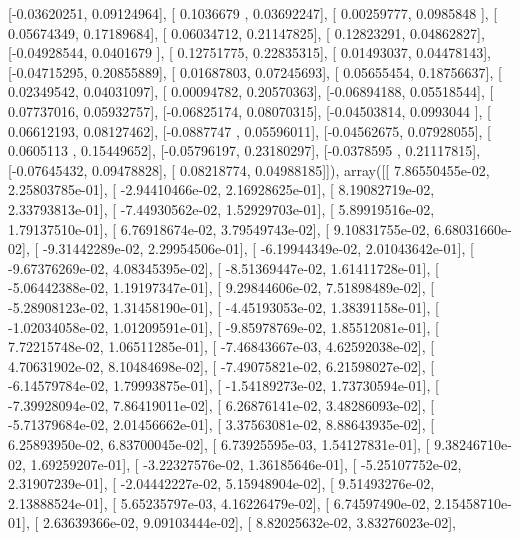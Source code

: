 \documentclass{article}
\begin{document}
       [-0.03620251,  0.09124964],
       [ 0.1036679 ,  0.03692247],
       [ 0.00259777,  0.0985848 ],
       [ 0.05674349,  0.17189684],
       [ 0.06034712,  0.21147825],
       [ 0.12823291,  0.04862827],
       [-0.04928544,  0.0401679 ],
       [ 0.12751775,  0.22835315],
       [ 0.01493037,  0.04478143],
       [-0.04715295,  0.20855889],
       [ 0.01687803,  0.07245693],
       [ 0.05655454,  0.18756637],
       [ 0.02349542,  0.04031097],
       [ 0.00094782,  0.20570363],
       [-0.06894188,  0.05518544],
       [ 0.07737016,  0.05932757],
       [-0.06825174,  0.08070315],
       [-0.04503814,  0.0993044 ],
       [ 0.06612193,  0.08127462],
       [-0.0887747 ,  0.05596011],
       [-0.04562675,  0.07928055],
       [ 0.0605113 ,  0.15449652],
       [-0.05796197,  0.23180297],
       [-0.0378595 ,  0.21117815],
       [-0.07645432,  0.09478828],
       [ 0.08218774,  0.04988185]]), array([[  7.86550455e-02,   2.25803785e-01],
       [ -2.94410466e-02,   2.16928625e-01],
       [  8.19082719e-02,   2.33793813e-01],
       [ -7.44930562e-02,   1.52929703e-01],
       [  5.89919516e-02,   1.79137510e-01],
       [  6.76918674e-02,   3.79549743e-02],
       [  9.10831755e-02,   6.68031660e-02],
       [ -9.31442289e-02,   2.29954506e-01],
       [ -6.19944349e-02,   2.01043642e-01],
       [ -9.67376269e-02,   4.08345395e-02],
       [ -8.51369447e-02,   1.61411728e-01],
       [ -5.06442388e-02,   1.19197347e-01],
       [  9.29844606e-02,   7.51898489e-02],
       [ -5.28908123e-02,   1.31458190e-01],
       [ -4.45193053e-02,   1.38391158e-01],
       [ -1.02034058e-02,   1.01209591e-01],
       [ -9.85978769e-02,   1.85512081e-01],
       [  7.72215748e-02,   1.06511285e-01],
       [ -7.46843667e-03,   4.62592038e-02],
       [  4.70631902e-02,   8.10484698e-02],
       [ -7.49075821e-02,   6.21598027e-02],
       [ -6.14579784e-02,   1.79993875e-01],
       [ -1.54189273e-02,   1.73730594e-01],
       [ -7.39928094e-02,   7.86419011e-02],
       [  6.26876141e-02,   3.48286093e-02],
       [ -5.71379684e-02,   2.01456662e-01],
       [  3.37563081e-02,   8.88643935e-02],
       [  6.25893950e-02,   6.83700045e-02],
       [  6.73925595e-03,   1.54127831e-01],
       [  9.38246710e-02,   1.69259207e-01],
       [ -3.22327576e-02,   1.36185646e-01],
       [ -5.25107752e-02,   2.31907239e-01],
       [ -2.04442227e-02,   5.15948904e-02],
       [  9.51493276e-02,   2.13888524e-01],
       [  5.65235797e-03,   4.16226479e-02],
       [  6.74597490e-02,   2.15458710e-01],
       [  2.63639366e-02,   9.09103444e-02],
       [  8.82025632e-02,   3.83276023e-02],
\end{document}

